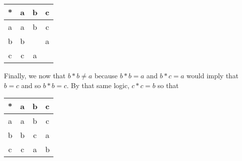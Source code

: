 \documentclass{article}
\begin{document}
\begin{center}\begin{tabular}{c | c c c}
	* & a & b & c \\ \hline
  a & a & b & c \\
  b & b &   & a \\
  c & c & a &   \\
\end{tabular} \end{center}
Finally, we now that $b*b \ne a$ because $b*b = a$ and $b*c = a$ would imply that $b = c$ and so $b*b = c$. By that same logic, $c*c = b$ so that
\begin{center}\begin{tabular}{c | c c c}
	* & a & b & c \\ \hline
  a & a & b & c \\
  b & b & c & a \\
  c & c & a & b \\
\end{tabular} \end{center}
\end{document}
